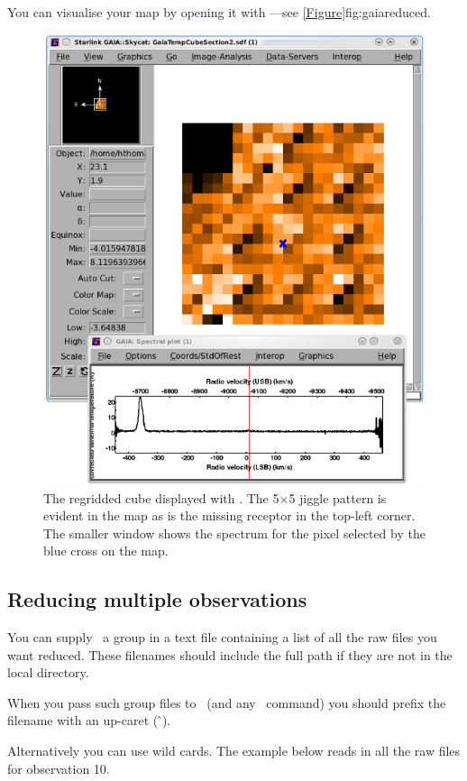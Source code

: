 \documentclass[11pt,oneside,chapters]{starlink}
\begin{document}
You can visualise your map by opening it with \gaia---see
\cref{Figure}{fig:gaiareduced}{}.

\begin{figure}[t!]
\begin{center}
\includegraphics[width=0.65\linewidth]{sc20_makecubeout}
\caption[A regridded cube produced with \makecube.]{\label{fig:gaiareduced}
  The regridded cube displayed with \gaia. The 5$\times$5 jiggle
  pattern is evident in the map as is the missing receptor in the
  top-left corner. The smaller window shows the spectrum for the pixel
  selected by the blue cross on the map.}
\end{center}
\end{figure}

\subsection{Reducing multiple observations}

You can supply \makecube\ a group in a text file containing a list of
all the raw files you want reduced. These filenames should include the
full path if they are not in the local directory.

When you pass such group files to \makecube\ (and any \starlink\ command)
you should prefix the filename with an up-caret (\,\^\,).
\begin{terminalv}
\end{terminalv}

Alternatively you can use wild cards. The example below reads in all
the raw files for observation 10.
\begin{terminalv}
\end{terminalv}
\end{document}

